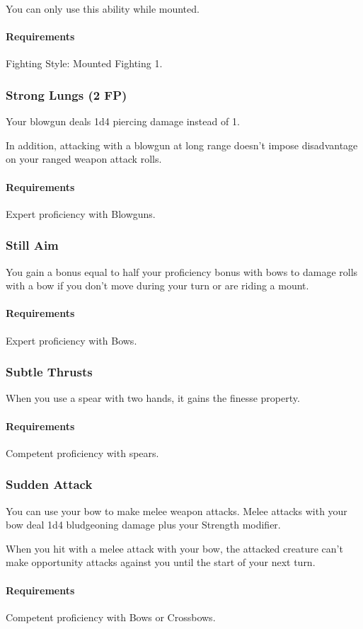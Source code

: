     You can only use this ability while mounted.
    \paragraph{Requirements} Fighting Style: Mounted Fighting 1.
\subsubsection{Strong Lungs (2 FP)} \label{feat::stronglungs}
    Your blowgun deals 1d4 piercing damage instead of 1.

    In addition, attacking with a blowgun at long range doesn't impose disadvantage on your ranged weapon attack rolls.
    \paragraph{Requirements} Expert proficiency with Blowguns.
\subsubsection{Still Aim} \label{feat::stillaim}
    You gain a bonus equal to half your proficiency bonus with bows to damage rolls with a bow if you don't move during your turn or are riding a mount.
    \paragraph{Requirements} Expert proficiency with Bows.
\subsubsection{Subtle Thrusts} \label{feat::subtlethrusts}
    When you use a spear with two hands, it gains the finesse property.
    \paragraph{Requirements} Competent proficiency with spears.
\subsubsection{Sudden Attack} \label{feat::suddenattack}
    You can use your bow to make melee weapon attacks.
    Melee attacks with your bow deal 1d4 bludgeoning damage plus your Strength modifier.

    When you hit with a melee attack with your bow, the attacked creature can't make opportunity attacks against you until the start of your next turn.
    \paragraph{Requirements} Competent proficiency with Bows or Crossbows.
